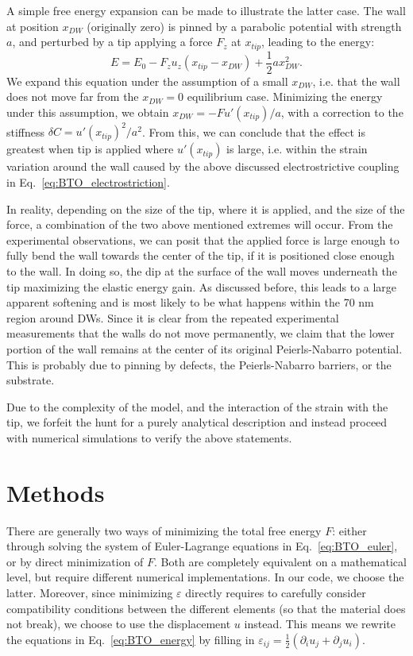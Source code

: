 A simple free energy expansion can be made to illustrate the latter case.
The wall at position $x_{DW}$ (originally zero) is pinned by a parabolic potential with strength $a$, and perturbed by a tip applying a force $F_z$ at $x_{tip}$, leading to the energy:
\begin{equation}
	E = E_0 - F_z u_z (x_{tip} - x_{DW}) + \frac{1}{2}a x_{DW}^2.
\end{equation}
We expand this equation under the assumption of a small $x_{DW}$, i.e. that the wall does not move far from the $x_{DW}=0$ equilibrium case.
Minimizing the energy under this assumption, we obtain $x_{DW} = -F u'(x_{tip})/a$, with a correction to the stiffness $\delta C = u'(x_{tip})^2/a^2$.
From this, we can conclude that the effect is greatest when tip is applied where $u'(x_{tip})$ is large, i.e. within the strain variation around the wall caused by the above discussed electrostrictive coupling in Eq.~\eqref{eq:BTO_electrostriction}.

In reality, depending on the size of the tip, where it is applied, and the size of the force, a combination of the two above mentioned extremes will occur.
From the experimental observations, we can posit that the applied force is large enough to fully bend the wall towards the center of the tip, if it is positioned close enough to the wall.
In doing so, the dip at the surface of the wall moves underneath the tip maximizing the elastic energy gain.
As discussed before, this leads to a large apparent softening and is most likely to be what happens within the 70 nm region around DWs.
Since it is clear from the repeated experimental measurements that the walls do not move permanently, we claim that the lower portion of the wall remains at the center of its original Peierls-Nabarro potential.
This is probably due to pinning by defects, the Peierls-Nabarro barriers, or the substrate.

Due to the complexity of the model, and the interaction of the strain with the tip, we forfeit the hunt for a purely analytical description and instead proceed with numerical simulations to verify the above statements.

\section{Methods}
There are generally two ways of minimizing the total free energy $F$: either through solving the system of Euler-Lagrange equations in Eq.~\eqref{eq:BTO_euler}, or by direct minimization of $F$.
Both are completely equivalent on a mathematical level, but require different numerical implementations.
In our code, we choose the latter.
Moreover, since minimizing $\varepsilon$ directly requires to carefully consider compatibility conditions between the different elements (so that the material does not break)\cite{Marton2007}, we choose to use the displacement $u$ instead.
This means we rewrite the equations in Eq.~\eqref{eq:BTO_energy} by filling in $\varepsilon_{ij} = \frac{1}{2}(\partial_i u_j + \partial_j u_i)$.


